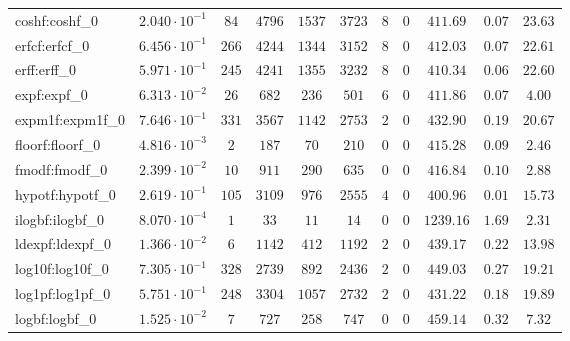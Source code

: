 \begin{tabular}{|l|c|c|c|c|c|c|c|c|c|c|}
coshf:coshf\_0               & $ 2.040 \cdot 10^{-1} $ & $ 84     $ & $ 4796  $ & $ 1537  $ & $ 3723  $ & $ 8   $ & $ 0 $ & $ 411.69      $ & $ 0.07    $ & $ 23.63   $ \\
erfcf:erfcf\_0               & $ 6.456 \cdot 10^{-1} $ & $ 266    $ & $ 4244  $ & $ 1344  $ & $ 3152  $ & $ 8   $ & $ 0 $ & $ 412.03      $ & $ 0.07    $ & $ 22.61   $ \\
erff:erff\_0                 & $ 5.971 \cdot 10^{-1} $ & $ 245    $ & $ 4241  $ & $ 1355  $ & $ 3232  $ & $ 8   $ & $ 0 $ & $ 410.34      $ & $ 0.06    $ & $ 22.60   $ \\
expf:expf\_0                 & $ 6.313 \cdot 10^{-2} $ & $ 26     $ & $ 682   $ & $ 236   $ & $ 501   $ & $ 6   $ & $ 0 $ & $ 411.86      $ & $ 0.07    $ & $ 4.00    $ \\
expm1f:expm1f\_0             & $ 7.646 \cdot 10^{-1} $ & $ 331    $ & $ 3567  $ & $ 1142  $ & $ 2753  $ & $ 2   $ & $ 0 $ & $ 432.90      $ & $ 0.19    $ & $ 20.67   $ \\
floorf:floorf\_0             & $ 4.816 \cdot 10^{-3} $ & $ 2      $ & $ 187   $ & $ 70    $ & $ 210   $ & $ 0   $ & $ 0 $ & $ 415.28      $ & $ 0.09    $ & $ 2.46    $ \\
fmodf:fmodf\_0               & $ 2.399 \cdot 10^{-2} $ & $ 10     $ & $ 911   $ & $ 290   $ & $ 635   $ & $ 0   $ & $ 0 $ & $ 416.84      $ & $ 0.10    $ & $ 2.88    $ \\
hypotf:hypotf\_0             & $ 2.619 \cdot 10^{-1} $ & $ 105    $ & $ 3109  $ & $ 976   $ & $ 2555  $ & $ 4   $ & $ 0 $ & $ 400.96      $ & $ 0.01    $ & $ 15.73   $ \\
ilogbf:ilogbf\_0             & $ 8.070 \cdot 10^{-4} $ & $ 1      $ & $ 33    $ & $ 11    $ & $ 14    $ & $ 0   $ & $ 0 $ & $ 1239.16     $ & $ 1.69    $ & $ 2.31    $ \\
ldexpf:ldexpf\_0             & $ 1.366 \cdot 10^{-2} $ & $ 6      $ & $ 1142  $ & $ 412   $ & $ 1192  $ & $ 2   $ & $ 0 $ & $ 439.17      $ & $ 0.22    $ & $ 13.98   $ \\
log10f:log10f\_0             & $ 7.305 \cdot 10^{-1} $ & $ 328    $ & $ 2739  $ & $ 892   $ & $ 2436  $ & $ 2   $ & $ 0 $ & $ 449.03      $ & $ 0.27    $ & $ 19.21   $ \\
log1pf:log1pf\_0             & $ 5.751 \cdot 10^{-1} $ & $ 248    $ & $ 3304  $ & $ 1057  $ & $ 2732  $ & $ 2   $ & $ 0 $ & $ 431.22      $ & $ 0.18    $ & $ 19.89   $ \\
logbf:logbf\_0               & $ 1.525 \cdot 10^{-2} $ & $ 7      $ & $ 727   $ & $ 258   $ & $ 747   $ & $ 0   $ & $ 0 $ & $ 459.14      $ & $ 0.32    $ & $ 7.32    $ \\

\end{tabular}
